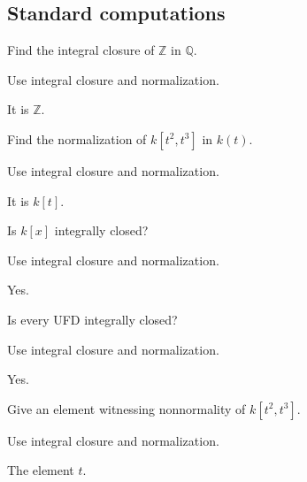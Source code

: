 \subsection*{Standard computations}

\begin{exercise}\label{exr:v20-expand-01}
Find the integral closure of $\mathbb Z$ in $\mathbb Q$.
\end{exercise}
\begin{hint}
Use integral closure and normalization.
\end{hint}
\begin{solution}
It is $\mathbb Z$.
\end{solution}

\begin{exercise}\label{exr:v20-expand-02}
Find the normalization of $k[t^2,t^3]$ in $k(t)$.
\end{exercise}
\begin{hint}
Use integral closure and normalization.
\end{hint}
\begin{solution}
It is $k[t]$.
\end{solution}

\begin{exercise}\label{exr:v20-expand-03}
Is $k[x]$ integrally closed?
\end{exercise}
\begin{hint}
Use integral closure and normalization.
\end{hint}
\begin{solution}
Yes.
\end{solution}

\begin{exercise}[UFD]\label{exr:v20-expand-04}
Is every UFD integrally closed?
\end{exercise}
\begin{hint}
Use integral closure and normalization.
\end{hint}
\begin{solution}
Yes.
\end{solution}

\begin{exercise}[Witness]\label{exr:v20-expand-05}
Give an element witnessing nonnormality of $k[t^2,t^3]$.
\end{exercise}
\begin{hint}
Use integral closure and normalization.
\end{hint}
\begin{solution}
The element $t$.
\end{solution}

